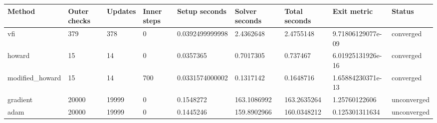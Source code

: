 \begin{tabular}{lllllllll}
\hline
Method & Outer checks & Updates & Inner steps & Setup seconds & Solver seconds & Total seconds & Exit metric & Status \\
\hline
vfi & 379 & 378 & 0 & 0.0392499999998 & 2.4362648 & 2.4755148 & 9.71806129077e-09 & converged \\
howard & 15 & 14 & 0 & 0.0357365 & 0.7017305 & 0.737467 & 6.01925131926e-16 & converged \\
modified\_howard & 15 & 14 & 700 & 0.0331574000002 & 0.1317142 & 0.1648716 & 1.65884230371e-13 & converged \\
gradient & 20000 & 19999 & 0 & 0.1548272 & 163.1086992 & 163.2635264 & 1.25760122606 & unconverged \\
adam & 20000 & 19999 & 0 & 0.1445246 & 159.8902966 & 160.0348212 & 0.125301311634 & unconverged \\
\hline
\end{tabular}
